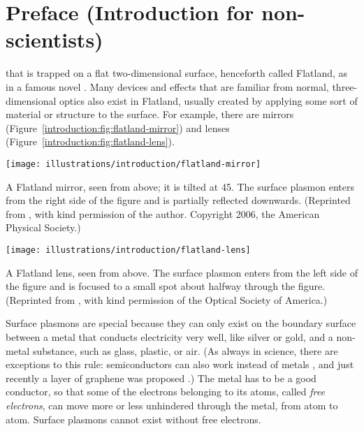 \chapter*{Preface (Introduction for non-scientists)}
\label{ch:summary}

 that is trapped on a flat two-dimensional surface, henceforth called Flatland, as in a famous novel \cite{Abbott}.
Many devices and effects that are familiar from normal, three-dim\-en\-sion\-al optics also exist in Flatland, usually created by applying some sort of material or structure to the surface.
For example, there are mirrors (Figure~\ref{introduction:fig:flatland-mirror}) and lenses (Figure~\ref{introduction:fig:flatland-lens}).
%
\begin{marginfigure}
  \forcerectofloat
  \texttt{[image: illustrations/introduction/flatland-mirror]}
  \caption{A Flatland mirror, seen from above; it is tilted at 45\textdegree.
The surface plasmon enters from the right side of the figure and is partially reflected downwards.
(Reprinted from \textcite{Gonzalez2006}, with kind permission of the author.
Copyright 2006, the American Physical Society.)}
  \label{introduction:fig:flatland-mirror}
\end{marginfigure}
%
\begin{marginfigure}
  \forcerectofloat
  \texttt{[image: illustrations/introduction/flatland-lens]}
  \caption{A Flatland lens, seen from above.
The surface plasmon enters from the left side of the figure and is focused to a small spot about halfway through the figure.
(Reprinted from \textcite{Devaux2010}, with kind permission of the Optical Society of America.)}
  \label{introduction:fig:flatland-lens}
\end{marginfigure}

Surface plasmons are special because they can only exist on the boundary surface between a metal that conducts electricity very well, like silver or gold, and a non-metal substance, such as glass, plastic, or air.
(As always in science, there are exceptions to this rule: semiconductors can also work instead of metals \cite{Rivas2006}, and just recently a layer of graphene was proposed \cite{Gorbach2013}.)
The metal has to be a good conductor, so that some of the electrons belonging to its atoms, called \emph{free electrons}, can move more or less unhindered through the metal, from atom to atom.
Surface plasmons cannot exist without free electrons.

